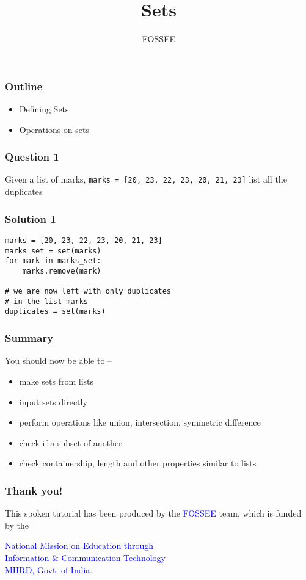 \documentclass[presentation]{beamer}
\title{Sets}
\author{FOSSEE}
\date{}
\begin{document}
\maketitle









\begin{frame}
\frametitle{Outline}
\label{sec-1}

\begin{itemize}
\item Defining Sets
\item Operations on sets
\end{itemize}
\end{frame}
\begin{frame}
\frametitle{Question 1}
\label{sec-2}

  Given a list of marks, \texttt{marks = [20, 23, 22, 23, 20, 21, 23]} list
  all the duplicates
\end{frame}
\begin{frame}[fragile]
\frametitle{Solution 1}
\label{sec-3}

\lstset{language=Python}
\begin{lstlisting}
marks = [20, 23, 22, 23, 20, 21, 23] 
marks_set = set(marks)
for mark in marks_set:
    marks.remove(mark)

# we are now left with only duplicates
# in the list marks
duplicates = set(marks)
\end{lstlisting}
\end{frame}
\begin{frame}
\frametitle{Summary}
\label{sec-4}

  You should now be able to --
\begin{itemize}
\item make sets from lists
\item input sets directly
\item perform operations like union, intersection, symmetric difference
\item check if a subset of another
\item check containership, length and other properties similar to lists
\end{itemize}
\end{frame}
\begin{frame}
\frametitle{Thank you!}
\label{sec-5}

  \begin{block}{}
  \begin{center}
  This spoken tutorial has been produced by the
  \textcolor{blue}{FOSSEE} team, which is funded by the 
  \end{center}
  \begin{center}
    \textcolor{blue}{National Mission on Education through \\
      Information \& Communication Technology \\ 
      MHRD, Govt. of India}.
  \end{center}  
  \end{block}
\end{frame}
\end{document}
